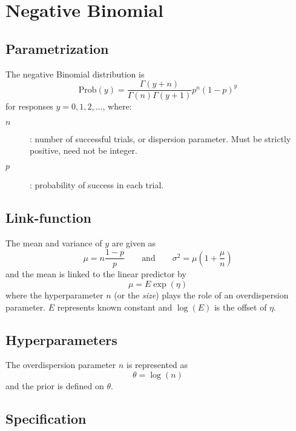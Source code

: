 \documentclass[a4paper,11pt]{article}
\begin{document}
\section*{Negative Binomial}

\subsection*{Parametrization}

The negative Binomial distribution is
\begin{displaymath}
    \text{Prob}(y) = \frac{\Gamma(y+n)}{\Gamma(n) \Gamma(y+1)} p^n (1-p)^y
\end{displaymath}
for responses $y=0, 1, 2, \ldots$, where:
\begin{description}
\item[$n$]: number of successful trials, or dispersion
    parameter. Must be strictly positive, need not be integer.
\item[$p$]: probability of success in each trial.
\end{description}

\subsection*{Link-function}

The mean and variance of $y$ are given as
\begin{displaymath}
    \mu = n \frac{1-p}{p} \qquad\text{and}\qquad \sigma^{2} = \mu(1 + \frac{\mu}{n})
\end{displaymath}
and the mean is linked to the linear predictor by
\begin{displaymath}
    \mu = E \exp(\eta)
\end{displaymath}
where the hyperparameter $n$ (or the \emph{size}) plays the role of an
overdispersion parameter. $E$ represents known constant and
$\log(E)$ is the offset of $\eta$.

\subsection*{Hyperparameters}

The overdispersion parameter $n$ is represented as
\begin{displaymath}
    \theta = \log(n)
\end{displaymath}
and the prior is defined on $\theta$. 

\subsection*{Specification}
\end{document}

